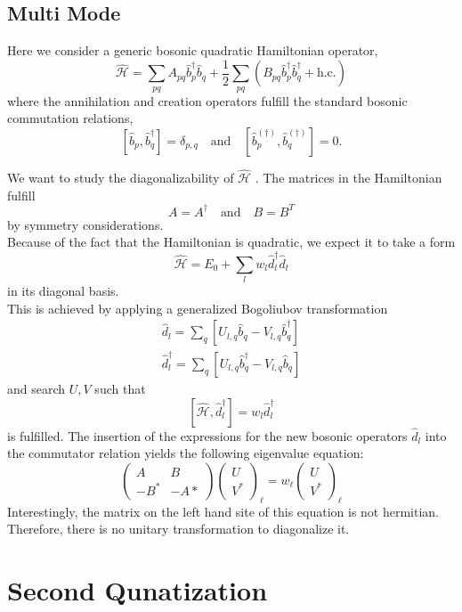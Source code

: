 \documentclass[11pt]{book}
\newcommand{\comm}[2]{\left[#1,#2\right]}
\renewcommand{\b}{\hat{b}}
\newcommand{\bd}{\hat{b}^\dagger}
\renewcommand{\d}{\hat{d}}
\newcommand{\dd}{\hat{d}^\dagger}
\renewcommand{\H}{\hat{\mathcal{H}}}
\newcommand{\hc}{\text{h.c.}}
\begin{document}
\section{Multi Mode}
Here we consider a generic bosonic quadratic Hamiltonian operator,
\begin{equation}
  \H = \sum_{pq} A_{pq} \bd_p \b_q + \dfrac{1}{2} \sum_{pq} \left( B_{pq} \bd_p \bd_q +\hc \right)
\end{equation}
where the annihilation and creation operators fulfill the standard bosonic commutation relations,
\begin{equation}
  \comm{\b_p}{\bd_q} = \delta_{p,q} \quad \text{and} \quad \comm{\b^{(\dagger)}_p}{\b^{(\dagger)}_q} = 0.
\end{equation}

We want to study the diagonalizability of $ \H $ . The matrices in the Hamiltonian fulfill \[A = A^\dagger \quad{\text{and}}\quad  B = B^T\] by symmetry considerations.\\
Because of the fact that the Hamiltonian is quadratic, we expect it to take a form
\begin{equation}
    \H = E_0 + \sum_l w_l \dd_l\d_l
\end{equation}
in its diagonal basis.\\
This is achieved by applying a generalized Bogoliubov transformation
\begin{eqnarray}
    \d_l = \sum_q \left[U_{l,q}\b_q -V_{l,q}\bd_q\right]\\
    \dd_l = \sum_q \left[U_{l,q}\bd_q - V_{l,q}\b_q \right]
\end{eqnarray}
and search $U,V$ such that
\begin{equation}
  \comm{\H}{\dd_l} = w_l \dd_l
\end{equation}
is fulfilled. The insertion of the expressions for the new bosonic operators $ \d_{l} $ into the commutator relation yields the following eigenvalue equation:
\begin{equation}
  \begin{pmatrix}
    A & B \\ 
    -B^* & -A*
  \end{pmatrix}
  \begin{pmatrix}
    U \\ V^*
  \end{pmatrix}_{\ell} 
  = w_{\ell} 
  \begin{pmatrix}
    U \\ V^*
  \end{pmatrix}_{\ell}
\end{equation}
Interestingly, the matrix on the left hand site of this equation is not hermitian. Therefore, there is no unitary transformation to diagonalize it.



\clearpage
\newpage
\chapter{Second Qunatization}





\clearpage
\newpage


\end{document}
